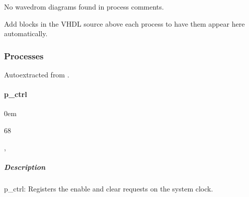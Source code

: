 \documentclass[letterpaper,10pt,english]{sphinxmanual}
\begin{document}
\sphinxAtStartPar
No wavedrom diagrams found in process comments.

\sphinxAtStartPar
Add  blocks in the VHDL source above each
process to have them appear here automatically.

\sphinxstepscope


\subsubsection{Processes}
\label{\detokenize{modules/sample_capture/processes/index:processes}}\label{\detokenize{modules/sample_capture/processes/index::doc}}
\sphinxAtStartPar
Auto\sphinxhyphen{}extracted from .

\sphinxstepscope


\paragraph{p\_ctrl}
\label{\detokenize{modules/sample_capture/processes/p_ctrl:p-ctrl}}\label{\detokenize{modules/sample_capture/processes/p_ctrl::doc}}
\begin{DUlineblock}{0em}
\item[]  
\item[]  68
\item[]  
\item[]  , 
\end{DUlineblock}


\subparagraph{Description}
\label{\detokenize{modules/sample_capture/processes/p_ctrl:description}}
\sphinxAtStartPar
p\_ctrl: Registers the enable and clear requests on the system clock.
\end{document}
